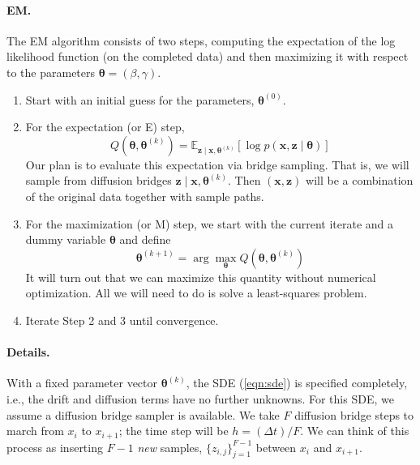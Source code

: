 \documentclass[12pt]{article}
\newcommand{\btheta}{\ensuremath{\boldsymbol{\theta}}}
\newcommand{\bx}{\ensuremath{\mathbf{x}}}
\newcommand{\bz}{\ensuremath{\mathbf{z}}}
\begin{document}
\paragraph{EM.} The EM algorithm consists of two steps, computing the expectation of the log likelihood function (on the completed data) and then maximizing it with respect to the parameters $\btheta = (\beta, \gamma)$. 
\begin{enumerate}
\item Start with an initial guess for the parameters, $\btheta^{(0)}$.
\item For the expectation (or E) step,
\begin{equation}
\label{eqn:expectation}
Q(\btheta, \btheta^{(k)}) = \mathbb{E}_{\bz \mid \bx, \btheta^{(k)}} [\log p(\bx, \bz \mid \btheta)]
\end{equation}
Our plan is to evaluate this expectation via bridge sampling.  That is, we will sample from diffusion bridges $\bz \mid \bx, \btheta^{(k)}$.  Then $(\bx, \bz)$ will be a combination of the original data together with sample paths.
\item For the maximization (or M) step, we start with the current iterate and a dummy variable $\btheta$ and define
\begin{equation}
\label{eqn:maximization}
\btheta^{(k+1)} = \arg \max_{\btheta} Q(\btheta, \btheta^{(k)})
\end{equation}
It will turn out that we can maximize this quantity without numerical optimization.  All we will need to do is solve a least-squares problem.
\item Iterate Step 2 and 3 until convergence.
\end{enumerate}

\paragraph{Details.} With a fixed parameter vector $\btheta^{(k)}$, the SDE (\ref{eqn:sde}) is specified completely, i.e., the drift and diffusion terms have no further unknowns.  For this SDE, we assume a diffusion bridge sampler is available.  We take $F$ diffusion bridge steps to march from $x_i$ to $x_{i+1}$; the time step will be $h = (\Delta t)/F$.  We can think of this process as inserting $F-1$ \emph{new} samples, $\{z_{i,j}\}_{j=1}^{F-1}$ between $x_i$ and $x_{i+1}$.  
\end{document}
